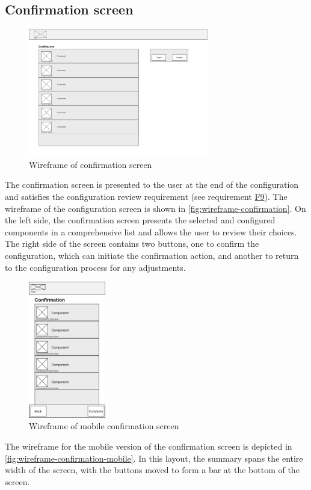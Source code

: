 \subsection{Confirmation screen}

\begin{figure}[hb]
\centering
\includegraphics[width=0.7\textwidth]{images/wireframe_confirmation_default.png}
\caption{Wireframe of confirmation screen}
\label{fig:wireframe-confirmation}
\end{figure}

The confirmation screen is presented to the user at the end of the configuration and satisfies the configuration review requirement (see requirement \hyperref[itm:F9]{F9}). The wireframe of the configuration screen is shown in \autoref{fig:wireframe-confirmation}. On the left side, the confirmation screen presents the selected and configured components in a comprehensive list and allows the user to review their choices. The right side of the screen contains two buttons, one to confirm the configuration, which can initiate the confirmation action, and another to return to the configuration process for any adjustments. 

\begin{figure}[h]
\centering
\includegraphics[width=0.3\textwidth]{images/wireframe_confirmation_mobile_default.png}
\caption{Wireframe of mobile confirmation screen}
\label{fig:wireframe-confirmation-mobile}
\end{figure}

The wireframe for the mobile version of the confirmation screen is depicted in  \autoref{fig:wireframe-confirmation-mobile}. In this layout, the summary spans the entire width of the screen, with the buttons moved to form a bar at the bottom of the screen.

